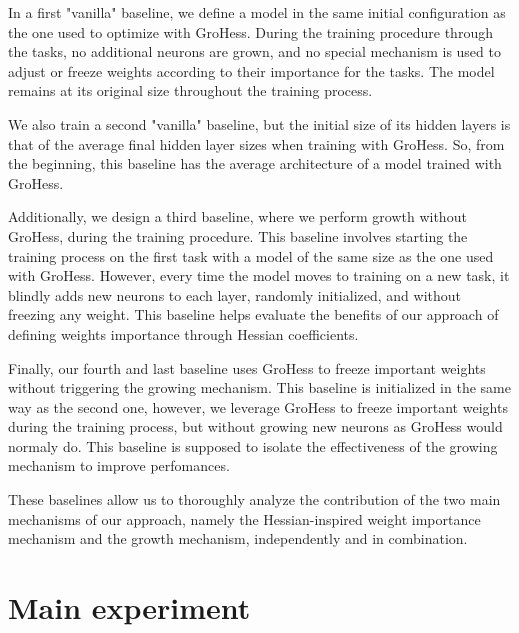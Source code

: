 \documentclass[11pt]{article}
\begin{document}
\vspace{2mm}
\noindent
In a first "vanilla" baseline, we define a model in the same initial configuration as the one used to optimize with GroHess. During the training procedure through the tasks, no additional neurons are grown, and no special mechanism is used to adjust or freeze weights according to their importance for the tasks. The model remains at its original size throughout the training process. 

\vspace{2mm}
\noindent
We also train a second "vanilla" baseline, but the initial size of its hidden layers is that of the average final hidden layer sizes when training with GroHess. So, from the beginning, this baseline has the average architecture of a model trained with GroHess. 

\vspace{2mm}
\noindent
Additionally, we design a third baseline, where we perform growth without GroHess, during the training procedure. This baseline involves starting the training process on the first task with a model of the same size as the one used with GroHess. However, every time the model moves to training on a new task, it blindly adds new neurons to each layer, randomly initialized, and without freezing any weight. This baseline helps evaluate the benefits of our approach of defining weights importance through Hessian coefficients. 

\vspace{2mm}
\noindent
Finally, our fourth and last baseline uses GroHess to freeze important weights without triggering the growing mechanism. This baseline is initialized in the same way as the second one, however, we leverage GroHess to freeze important weights during the training process, but without growing new neurons as GroHess would normaly do. This baseline is supposed to isolate the effectiveness of the growing mechanism to improve perfomances.

\vspace{2mm}
\noindent
These baselines allow us to thoroughly analyze the contribution of the two main mechanisms of our approach, namely the Hessian-inspired weight importance mechanism and the growth mechanism, independently and in combination.



\section{Main experiment}
\end{document}
